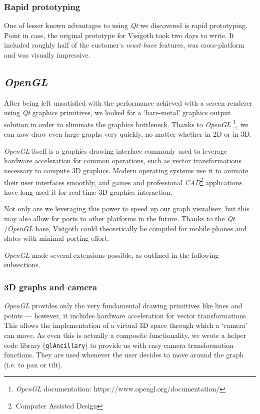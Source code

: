 \documentclass[a4paper,11pt,titlepage]{article}
\newcommand{\code}[1]{\texttt{#1}}
\newcommand{\buzz}[1]{\emph{#1}}
\newcommand{\Qt}{\buzz{Qt} }
\newcommand{\OpenGL}{\buzz{OpenGL} }
\begin{document}

\subsubsection{Rapid prototyping}

One of lesser known advantages to using \Qt we discovered is rapid
prototyping. Point in case, the original prototype for Visigoth took
two days to write. It included roughly half of the customer's
\emph{must-have} features, was cross-platform and was visually
impressive.

\subsection{\OpenGL}
\label{opengl}

After being left unsatisfied with the performance achieved with a
screen renderer using \Qt graphics primitives, we looked for a
`bare-metal' graphics output solution in order to eliminate the
graphics bottleneck. Thanks to \OpenGL\footnote{\OpenGL
  documentation: https://www.opengl.org/documentation/}, we can now
draw even large graphs very quickly, no matter whether in 2D or in 3D.

\OpenGL itself is a graphics drawing interface commonly used to
leverage hardware acceleration for common operations, such as vector
transformations necessary to compute 3D graphics. Modern operating
systems use it to animate their user interfaces smoothly, and games
and professional \buzz{CAD}\footnote{Computer Assisted Design}
applications have long used it for real-time 3D graphics interaction.

Not only are we leveraging this power to speed up our graph
visualiser, but this may also allow for ports to other
platforms in the future. Thanks to the \Qt/\OpenGL base, Visigoth
could theoretically be compiled for mobile phones and slates
with minimal porting effort.

\OpenGL made several extensions possible, as outlined in the following
subsections.

\subsubsection{3D graphs and camera}
\OpenGL provides only the very fundamental drawing primitives like
lines and points --- however, it includes hardware acceleration for
vector transformations. This allows the implementation of a virtual 3D
space through which a `camera' can move. As even this is actually a
composite functionality, we wrote a helper code library
(\code{glAncillary}) to provide us with easy camera transformation
functions. They are used whenever the user decides to move around the
graph (i.e. to pan or tilt).
\end{document}

